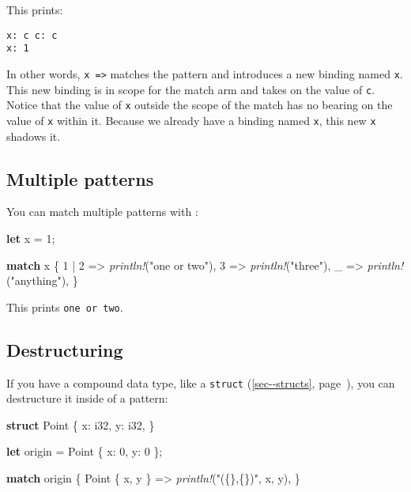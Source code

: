 \documentclass[a4paper,]{book}
\renewcommand*{\hyperlink}[2]{%
 #2 (\autoref{#1}, page~\pageref{#1})}
\newenvironment{Shaded}{\begin{snugshade}}{\end{snugshade}}
\newcommand{\KeywordTok}[1]{\textcolor[rgb]{0.13,0.29,0.53}{\textbf{{#1}}}}
\newcommand{\DataTypeTok}[1]{\textcolor[rgb]{0.13,0.29,0.53}{{#1}}}
\newcommand{\DecValTok}[1]{\textcolor[rgb]{0.00,0.00,0.81}{{#1}}}
\newcommand{\StringTok}[1]{\textcolor[rgb]{0.31,0.60,0.02}{{#1}}}
\newcommand{\PreprocessorTok}[1]{\textcolor[rgb]{0.56,0.35,0.01}{\textit{{#1}}}}
\newcommand{\NormalTok}[1]{{#1}}
\begin{document}
This prints:

\begin{verbatim}
x: c c: c
x: 1
\end{verbatim}

In other words, \texttt{x\ =\textgreater{}} matches the pattern and
introduces a new binding named \texttt{x}. This new binding is in scope
for the match arm and takes on the value of \texttt{c}. Notice that the
value of \texttt{x} outside the scope of the match has no bearing on the
value of \texttt{x} within it. Because we already have a binding named
\texttt{x}, this new \texttt{x} shadows it.

\subsection{Multiple patterns}\label{multiple-patterns}

You can match multiple patterns with \texttt{\textbar{}}:

\begin{Shaded}
\begin{Highlighting}[]
\KeywordTok{let} \NormalTok{x = }\DecValTok{1}\NormalTok{;}

\KeywordTok{match} \NormalTok{x \{}
    \DecValTok{1} \NormalTok{| }\DecValTok{2} \NormalTok{=> }\PreprocessorTok{println!}\NormalTok{(}\StringTok{"one or two"}\NormalTok{),}
    \DecValTok{3} \NormalTok{=> }\PreprocessorTok{println!}\NormalTok{(}\StringTok{"three"}\NormalTok{),}
    \NormalTok{_ => }\PreprocessorTok{println!}\NormalTok{(}\StringTok{"anything"}\NormalTok{),}
\NormalTok{\}}
\end{Highlighting}
\end{Shaded}

This prints \texttt{one\ or\ two}.

\subsection{Destructuring}\label{destructuring}

If you have a compound data type, like a
\protect\hyperlink{sec--structs}{\texttt{struct}}, you can destructure
it inside of a pattern:

\begin{Shaded}
\begin{Highlighting}[]
\KeywordTok{struct} \NormalTok{Point \{}
    \NormalTok{x: }\DataTypeTok{i32}\NormalTok{,}
    \NormalTok{y: }\DataTypeTok{i32}\NormalTok{,}
\NormalTok{\}}

\KeywordTok{let} \NormalTok{origin = Point \{ x: }\DecValTok{0}\NormalTok{, y: }\DecValTok{0} \NormalTok{\};}

\KeywordTok{match} \NormalTok{origin \{}
    \NormalTok{Point \{ x, y \} => }\PreprocessorTok{println!}\NormalTok{(}\StringTok{"(\{\},\{\})"}\NormalTok{, x, y),}
\NormalTok{\}}
\end{Highlighting}
\end{Shaded}
\end{document}
